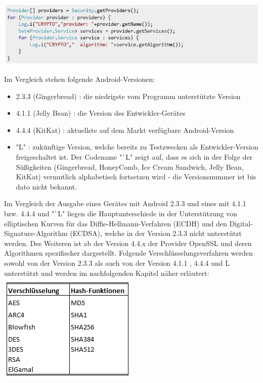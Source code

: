 \documentclass[10pt, a4paper,headsepline,pointednumbers]{scrreprt}
\begin{document}
\begin{center}
\includegraphics[scale=0.8]{read_cryptoprovider.JPG} 
\end{center}
Im Vergleich stehen folgende Android-Versionen:
\begin{itemize}
\item 2.3.3 (Gingerbread) : die niedrigste vom Programm unterstützte Version
\item 4.1.1 (Jelly Bean) : die Version des Entwickler-Gerätes
\item 4.4.4 (KitKat) : aktuellste auf dem Markt verfügbare Android-Version
\item "L" : zukünftige Version, welche bereits zu Testzwecken als Entwickler-Version freigeschaltet ist. Der Codename "`L" zeigt auf, dass es sich in der Folge der Süßigkeiten (Gingerbread, HoneyComb, Ice Cream Sandwich, Jelly Bean, KitKat) vermutlich alphabetisch fortsetzen wird - die Versionsnummer ist bis dato nicht bekannt.
\end{itemize}
Im Vergleich der Ausgabe eines Gerätes mit Android 2.3.3 und eines mit 4.1.1 bzw. 4.4.4 und "`L" liegen die Hauptunterschiede in der Unterstützung von elliptischen Kurven für das Diffie-Hellmann-Verfahren (ECDH) und den Digital-Signature-Algorithm (ECDSA), welche in der Version 2.3.3 nicht unterstützt werden. Des Weiteren ist ab der Version 4.4.x der Provider OpenSSL und deren Algorithmen spezifischer dargestellt.
Folgende Verschlüsselungsverfahren werden sowohl von der Version 2.3.3 als auch von der Version 4.1.1 , 4.4.4 und L unterstützt und werden im nachfolgenden Kapitel näher erläutert: \\

\includegraphics[scale=1.0]{vorh_crypto.PNG}
\hfill
\end{document}
